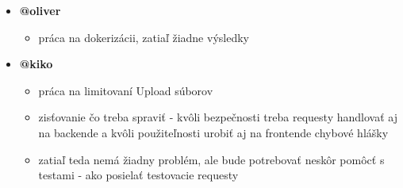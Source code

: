 \documentclass{article}
\begin{document}
\begin{itemize}
\begin{itemize}
        \end{itemize}
        \item \textbf {@oliver}
        \begin{itemize}
            \item práca na dokerizácii, zatiaľ žiadne výsledky
        \end{itemize}
        \item \textbf {@kiko}
        \begin{itemize}
            \item práca na limitovaní Upload súborov
            \item zisťovanie čo treba spraviť - kvôli bezpečnosti treba requesty handlovať aj na backende a kvôli použiteľnosti urobiť aj na frontende chybové hlášky
            \item zatiaľ teda nemá žiadny problém, ale bude potrebovať neskôr pomôcť s testami - ako posielať testovacie requesty
        \end{itemize}
    \end{itemize}    
\end{document}
